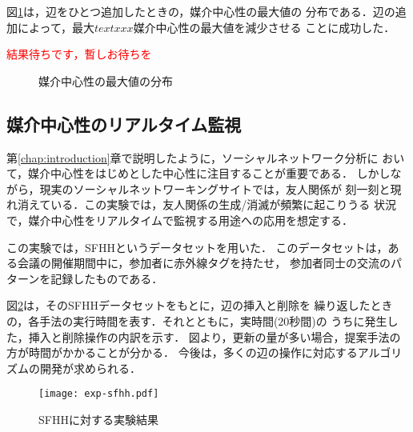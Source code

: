 図\ref{fig:exp-road}は，辺をひとつ追加したときの，媒介中心性の最大値の
分布である．辺の追加によって，最大$text{xxx}$媒介中心性の最大値を減少させる
ことに成功した．

\textcolor{red}{結果待ちです，暫しお待ちを}

\begin{figure}[tb]
  \centering
  \caption{媒介中心性の最大値の分布}
  \label{fig:exp-road}
\end{figure}

\subsection{媒介中心性のリアルタイム監視}
\label{subsect:exp-sfhh}

第\ref{chap:introduction}章で説明したように，ソーシャルネットワーク分析に
おいて，媒介中心性をはじめとした中心性に注目することが重要である．
しかしながら，現実のソーシャルネットワーキングサイトでは，友人関係が
刻一刻と現れ消えている．この実験では，友人関係の生成/消滅が頻繁に起こりうる
状況で，媒介中心性をリアルタイムで監視する用途への応用を想定する．

この実験では，SFHH\cite{Genois2018}というデータセットを用いた．
このデータセットは，ある会議の開催期間中に，参加者に赤外線タグを持たせ，
参加者同士の交流のパターンを記録したものである．

図\ref{fig:exp-sfhh}は，そのSFHHデータセットをもとに，辺の挿入と削除を
繰り返したときの，各手法の実行時間を表す．それとともに，実時間($20$秒間)の
うちに発生した，挿入と削除操作の内訳を示す．
図より，更新の量が多い場合，提案手法の方が時間がかかることが分かる．
今後は，多くの辺の操作に対応するアルゴリズムの開発が求められる．

\begin{figure}[tb]
  \centering
  \texttt{[image: exp-sfhh.pdf]}
  \caption{SFHHに対する実験結果}
  \label{fig:exp-sfhh}
\end{figure}
